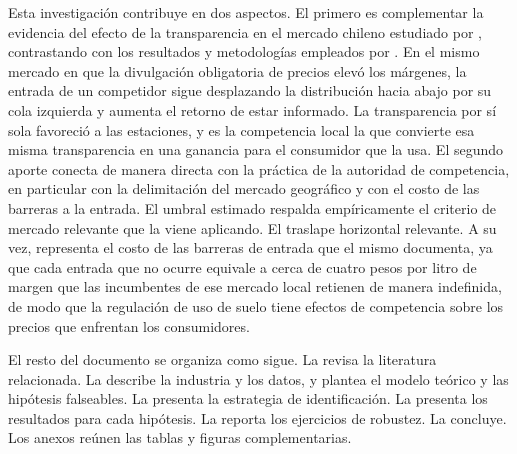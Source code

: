 Esta investigación contribuye en dos aspectos. El primero es complementar la evidencia del efecto de la transparencia en el mercado chileno estudiado por \textcite{LUCO2019}, contrastando con los resultados y metodologías empleados por \textcite{FISCHER2025}. En el mismo mercado en que la divulgación obligatoria de precios elevó los márgenes, la entrada de un competidor sigue desplazando la distribución hacia abajo por su cola izquierda y aumenta el retorno de estar informado. La transparencia por sí sola favoreció a las estaciones, y es la competencia local la que convierte esa misma transparencia en una ganancia para el consumidor que la usa. El segundo aporte conecta de manera directa con la práctica de la autoridad de competencia, en particular con la delimitación del mercado geográfico y con el costo de las barreras a la entrada. El umbral estimado respalda empíricamente el criterio de mercado relevante que la \textcite{FNE2021informe} viene aplicando. El traslape horizontal relevante. A su vez, representa el costo de las barreras de entrada que el mismo \textcite{TDLC2012} documenta, ya que cada entrada que no ocurre equivale a cerca de cuatro pesos por litro de margen que las incumbentes de ese mercado local retienen de manera indefinida, de modo que la regulación de uso de suelo tiene efectos de competencia sobre los precios que enfrentan los consumidores.

El resto del documento se organiza como sigue. La  revisa la literatura relacionada. La  describe la industria y los datos, y plantea el modelo teórico y las hipótesis falseables. La  presenta la estrategia de identificación. La  presenta los resultados para cada hipótesis. La  reporta los ejercicios de robustez. La  concluye. Los anexos reúnen las tablas y figuras complementarias.